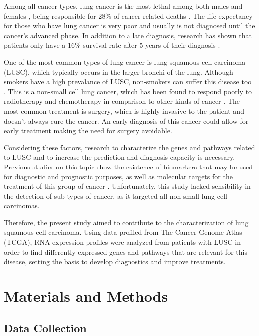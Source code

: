 \documentclass[9pt,twocolumn,twoside]{gsajnl}
\begin{document}
Among all cancer types, lung cancer is the most lethal among both males and females , being responsible for 28\% of cancer-related deaths \citep{WorldCancerReport}. The life expectancy for those who have lung cancer is very poor and usually is not diagnosed until the cancer's advanced phase. In addition to a late diagnosis, research has shown that patients only have a 16\% survival rate after 5 years of their diagnosis \citep{LungStudy}.

One of the most common types of lung cancer is lung squamous cell carcinoma (LUSC), which typically occurs in the larger bronchi of the lung. Although smokers have a high prevalance of LUSC, non-smokers can suffer this disease too \citep{park2017gab2}. This is a non-small cell lung cancer, which has been found to respond poorly to radiotherapy and chemotherapy in comparison to other kinds of cancer \citep{NCI}. The most common treatment is surgery, which is highly invasive to the patient and doesn't always cure the cancer. An early diagnosis of this cancer could allow for early treatment making the need for surgery avoidable.

Considering these factors, research to characterize the genes and pathways related to LUSC and to increase the prediction and diagnosis capacity is necessary. Previous studies on this topic show the existence of biomarkers that may be used for diagnostic and prognostic purposes, as well as molecular targets for the treatment of this group of cancer \citep{xiao2018identification, hayes2014micrornas}. Unfortunately, this study lacked sensibility in the detection of sub-types of cancer, as it targeted all non-small lung cell carcinomas. 

Therefore, the present study aimed to contribute to the characterization of lung squamous cell carcinoma. Using data profiled from The Cancer Genome Atlas (TCGA), RNA expression profiles were analyzed from patients with LUSC in order to find differently expressed genes and pathways that are relevant for this disease, setting the basis to develop diagnostics and improve treatments.


\section{Materials and Methods}
\label{sec:materials:methods}

\subsection{Data Collection}
\end{document}
